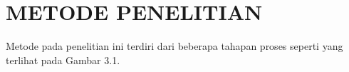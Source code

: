 \chapter{METODE PENELITIAN}

Metode pada penelitian ini terdiri dari beberapa tahapan proses seperti yang terlihat pada Gambar 3.1.





